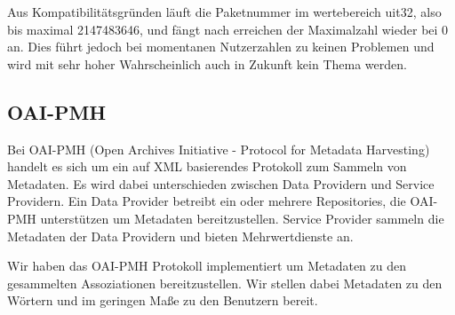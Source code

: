 Aus Kompatibilitätsgründen läuft die Paketnummer im wertebereich uit32, also bis maximal 2147483646, und fängt nach erreichen der Maximalzahl wieder bei 0 an. Dies führt jedoch bei momentanen Nutzerzahlen zu keinen Problemen und wird mit sehr hoher Wahrscheinlich auch in Zukunft kein Thema werden.

\subsection{OAI-PMH}\label{sec:oai-pmh} %
Bei OAI-PMH (Open Archives Initiative - Protocol for Metadata Harvesting) handelt es sich um ein auf XML basierendes Protokoll zum Sammeln von Metadaten. Es wird dabei unterschieden zwischen Data Providern und Service Providern. Ein Data Provider betreibt ein oder mehrere Repositories, die OAI-PMH unterstützen um Metadaten bereitzustellen. Service Provider sammeln die Metadaten der Data Providern und bieten Mehrwertdienste an.

Wir haben das OAI-PMH Protokoll implementiert um Metadaten zu den gesammelten Assoziationen bereitzustellen. Wir stellen dabei Metadaten zu den Wörtern und im geringen Maße zu den Benutzern bereit.